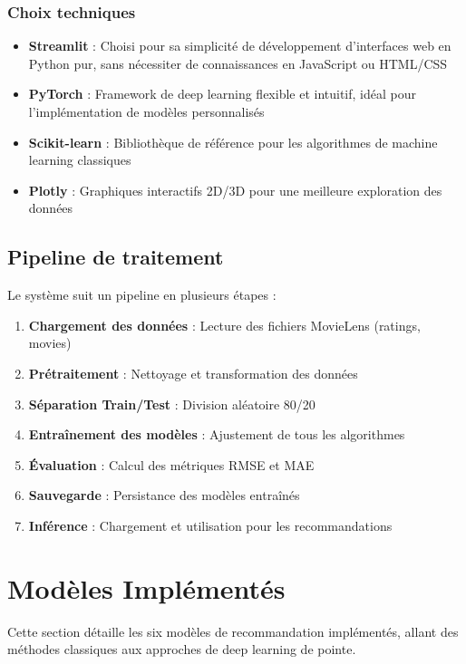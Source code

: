 \documentclass[12pt,a4paper]{article}
\begin{document}
\subsubsection{Choix techniques}

\begin{itemize}
    \item \textbf{Streamlit} : Choisi pour sa simplicité de développement d'interfaces web en Python pur, sans nécessiter de connaissances en JavaScript ou HTML/CSS
    \item \textbf{PyTorch} : Framework de deep learning flexible et intuitif, idéal pour l'implémentation de modèles personnalisés
    \item \textbf{Scikit-learn} : Bibliothèque de référence pour les algorithmes de machine learning classiques
    \item \textbf{Plotly} : Graphiques interactifs 2D/3D pour une meilleure exploration des données
\end{itemize}

\subsection{Pipeline de traitement}

Le système suit un pipeline en plusieurs étapes :

\begin{enumerate}
    \item \textbf{Chargement des données} : Lecture des fichiers MovieLens (ratings, movies)
    \item \textbf{Prétraitement} : Nettoyage et transformation des données
    \item \textbf{Séparation Train/Test} : Division aléatoire 80/20
    \item \textbf{Entraînement des modèles} : Ajustement de tous les algorithmes
    \item \textbf{Évaluation} : Calcul des métriques RMSE et MAE
    \item \textbf{Sauvegarde} : Persistance des modèles entraînés
    \item \textbf{Inférence} : Chargement et utilisation pour les recommandations
\end{enumerate}

\section{Modèles Implémentés}

Cette section détaille les six modèles de recommandation implémentés, allant des méthodes classiques aux approches de deep learning de pointe.
\end{document}
